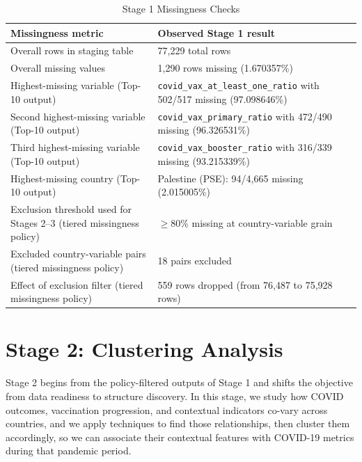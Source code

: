 \documentclass[a4paper]{report}
\begin{document}
\begin{table}[h]
    \centering
    \caption{Stage 1 Missingness Checks}
    \label{tab:stage1-qa-missingness}
    \begin{tabular}{|p{}|p{}|}
        \hline
        \textbf{Missingness metric} & \textbf{Observed Stage 1 result} \\
        \hline
        Overall rows in staging table & 77,229 total rows \\
        \hline
        Overall missing values & 1,290 rows missing (1.670357\%) \\
        \hline
        Highest-missing variable (Top-10 output) & \texttt{covid\_vax\_at\_least\_one\_ratio} with 502/517 missing (97.098646\%) \\
        \hline
        Second highest-missing variable (Top-10 output) & \texttt{covid\_vax\_primary\_ratio} with 472/490 missing (96.326531\%) \\
        \hline
        Third highest-missing variable (Top-10 output) & \texttt{covid\_vax\_booster\_ratio} with 316/339 missing (93.215339\%) \\
        \hline
        Highest-missing country (Top-10 output) & Palestine (PSE): 94/4,665 missing (2.015005\%) \\
        \hline
        Exclusion threshold used for Stages 2--3 (tiered missingness policy) & $\geq$80\% missing at country-variable grain \\
        \hline
        Excluded country-variable pairs (tiered missingness policy) & 18 pairs excluded \\
        \hline
        Effect of exclusion filter (tiered missingness policy) & 559 rows dropped (from 76,487 to 75,928 rows) \\
        \hline
    \end{tabular}
\end{table}

\section{Stage 2: Clustering Analysis}
Stage 2 begins from the policy-filtered outputs of Stage 1 and shifts the objective from data readiness to structure discovery.
In this stage, we study how COVID outcomes, vaccination progression, and contextual indicators co-vary across countries, and we apply techniques to find those relationships, then cluster them accordingly, so we can associate their contextual features with COVID-19 metrics during that pandemic period.
\end{document}
